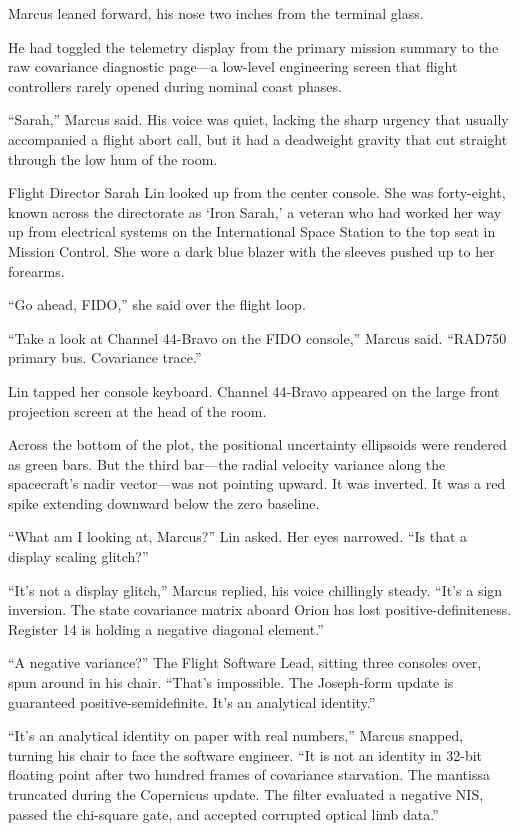 \documentclass[12pt,twoside,openright]{book}
\begin{document}
Marcus leaned forward, his nose two inches from the terminal glass.

He had toggled the telemetry display from the primary mission summary to
the raw covariance diagnostic page---a low-level engineering screen that
flight controllers rarely opened during nominal coast phases.

``Sarah,'' Marcus said. His voice was quiet, lacking the sharp urgency
that usually accompanied a flight abort call, but it had a deadweight
gravity that cut straight through the low hum of the room.

Flight Director Sarah Lin looked up from the center console. She was
forty-eight, known across the directorate as `Iron Sarah,' a veteran who
had worked her way up from electrical systems on the International Space
Station to the top seat in Mission Control. She wore a dark blue blazer
with the sleeves pushed up to her forearms.

``Go ahead, FIDO,'' she said over the flight loop.

``Take a look at Channel 44-Bravo on the FIDO console,'' Marcus said.
``RAD750 primary bus. Covariance trace.''

Lin tapped her console keyboard. Channel 44-Bravo appeared on the large
front projection screen at the head of the room.

Across the bottom of the plot, the positional uncertainty ellipsoids
were rendered as green bars. But the third bar---the radial velocity
variance along the spacecraft's nadir vector---was not pointing upward.
It was inverted. It was a red spike extending downward below the zero
baseline.

``What am I looking at, Marcus?'' Lin asked. Her eyes narrowed. ``Is
that a display scaling glitch?''

``It's not a display glitch,'' Marcus replied, his voice chillingly
steady. ``It's a sign inversion. The state covariance matrix aboard
Orion has lost positive-definiteness. Register 14 is holding a negative
diagonal element.''

``A negative variance?'' The Flight Software Lead, sitting three
consoles over, spun around in his chair. ``That's impossible. The
Joseph-form update is guaranteed positive-semidefinite. It's an
analytical identity.''

``It's an analytical identity on paper with real numbers,'' Marcus
snapped, turning his chair to face the software engineer. ``It is not an
identity in 32-bit floating point after two hundred frames of covariance
starvation. The mantissa truncated during the Copernicus update. The
filter evaluated a negative NIS, passed the chi-square gate, and
accepted corrupted optical limb data.''
\end{document}
